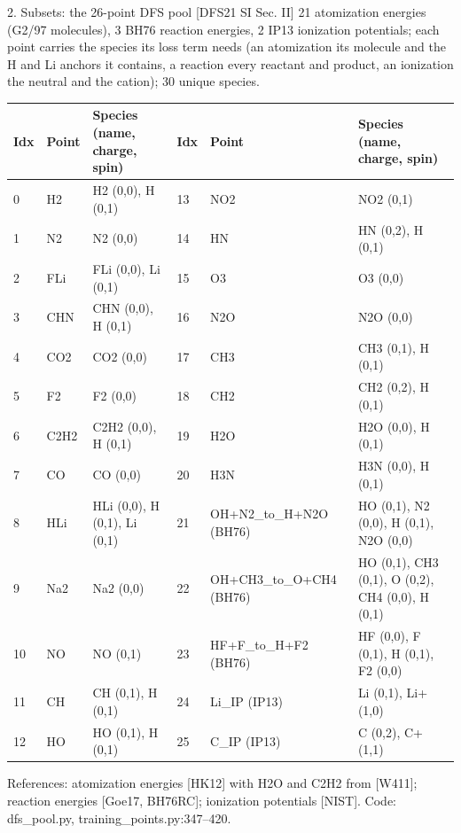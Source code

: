 \begin{frame}{2. Subsets: the 26-point DFS pool [DFS21 SI Sec. II]}
  \scriptsize
  21 atomization energies (G2/97 molecules), 3 BH76 reaction energies, 2 IP13 ionization potentials; each point carries the species its loss term needs (an atomization its molecule and the H and Li anchors it contains, a reaction every reactant and product, an ionization the neutral and the cation); 30 unique species.
  \begin{center}\scriptsize\setlength{\tabcolsep}{2pt}\renewcommand{\arraystretch}{0.78}
  \begin{tabular}{llp{3.5cm}|llp{5.6cm}}
  \toprule
  Idx & Point & Species (name, charge, spin) & Idx & Point & Species (name, charge, spin) \\ \midrule
  0 & H2 & H2 (0,0), H (0,1) & 13 & NO2 & NO2 (0,1) \\
  1 & N2 & N2 (0,0) & 14 & HN & HN (0,2), H (0,1) \\
  2 & FLi & FLi (0,0), Li (0,1) & 15 & O3 & O3 (0,0) \\
  3 & CHN & CHN (0,0), H (0,1) & 16 & N2O & N2O (0,0) \\
  4 & CO2 & CO2 (0,0) & 17 & CH3 & CH3 (0,1), H (0,1) \\
  5 & F2 & F2 (0,0) & 18 & CH2 & CH2 (0,2), H (0,1) \\
  6 & C2H2 & C2H2 (0,0), H (0,1) & 19 & H2O & H2O (0,0), H (0,1) \\
  7 & CO & CO (0,0) & 20 & H3N & H3N (0,0), H (0,1) \\
  8 & HLi & HLi (0,0), H (0,1), Li (0,1) & 21 & OH+N2\_to\_H+N2O (BH76) & HO (0,1), N2 (0,0), H (0,1), N2O (0,0) \\
  9 & Na2 & Na2 (0,0) & 22 & OH+CH3\_to\_O+CH4 (BH76) & HO (0,1), CH3 (0,1), O (0,2), CH4 (0,0), H (0,1) \\
  10 & NO & NO (0,1) & 23 & HF+F\_to\_H+F2 (BH76) & HF (0,0), F (0,1), H (0,1), F2 (0,0) \\
  11 & CH & CH (0,1), H (0,1) & 24 & Li\_IP (IP13) & Li (0,1), Li+ (1,0) \\
  12 & HO & HO (0,1), H (0,1) & 25 & C\_IP (IP13) & C (0,2), C+ (1,1) \\
  \bottomrule
  \end{tabular}
  \end{center}
  \tiny
  References: atomization energies [HK12] with H2O and C2H2 from [W411]; reaction energies [Goe17, BH76RC]; ionization potentials [NIST]. Code: dfs\_pool.py, training\_points.py:347--420.
\end{frame}
